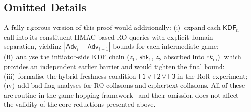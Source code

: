 \documentclass{SCIS2026}
\newcommand{\Adv}{\mathsf{Adv}}
\newcommand{\KDF}{\mathsf{KDF}}
\begin{document}
\begin{appendix}
\subsection*{Omitted Details}

A fully rigorous version of this proof would additionally:
(i)~expand each $\KDF_n$ call into its constituent HMAC-based RO
queries with explicit domain separation, yielding
$|\Adv_i - \Adv_{i+1}|$ bounds for each intermediate game;
(ii)~analyse the initiator-side KDF chain ($z_1$, $\textsf{shk}_1$,
$z_2$ absorbed into $ck_{\text{in}}$), which provides an independent
earlier barrier and would tighten the final bound;
(iii)~formalise the hybrid freshness condition
$\textsf{F1} \lor \textsf{F2} \lor \textsf{F3}$ in the RoR experiment;
(iv)~add bad-flag analyses for RO collisions and ciphertext collisions.
All of these are routine in the game-hopping
framework~\cite{32,35} and their omission does not affect the
validity of the core reductions presented above.

\end{appendix}
\end{document}
